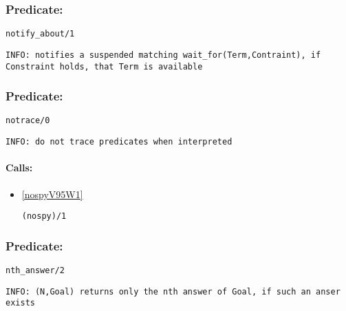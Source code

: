 \subsubsection{Predicate:} \label{notifyV95WaboutV95W1}

\begin{verbatim}
notify_about/1
\end{verbatim}

{\small \begin{verbatim}
INFO: notifies a suspended matching wait_for(Term,Contraint), if Constraint holds, that Term is available

\end{verbatim}}

\subsubsection{Predicate:} \label{notraceV95W0}

\begin{verbatim}
notrace/0
\end{verbatim}

{\small \begin{verbatim}
INFO: do not trace predicates when interpreted

\end{verbatim}}
\paragraph{Calls:} 
\begin{itemize}
\item \ref{nospyV95W1} 
\begin{verbatim}
(nospy)/1
\end{verbatim}

\end{itemize}

\subsubsection{Predicate:} \label{nthV95WanswerV95W2}

\begin{verbatim}
nth_answer/2
\end{verbatim}

{\small \begin{verbatim}
INFO: (N,Goal) returns only the nth answer of Goal, if such an anser exists

\end{verbatim}}
